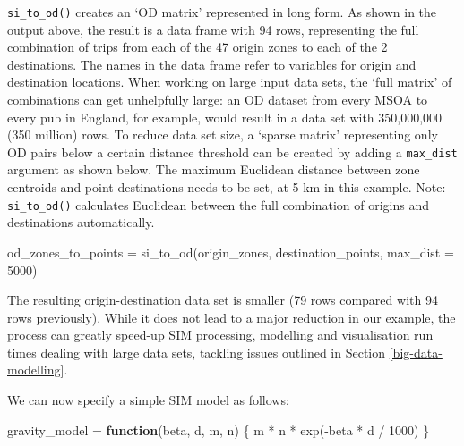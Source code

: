 \documentclass[11pt,letterpaper]{article}
\newenvironment{Shaded}{\begin{snugshade}}{\end{snugshade}}
\newcommand{\AttributeTok}[1]{\textcolor[rgb]{0.77,0.63,0.00}{#1}}
\newcommand{\ControlFlowTok}[1]{\textcolor[rgb]{0.13,0.29,0.53}{\textbf{#1}}}
\newcommand{\DecValTok}[1]{\textcolor[rgb]{0.00,0.00,0.81}{#1}}
\newcommand{\FunctionTok}[1]{\textcolor[rgb]{0.00,0.00,0.00}{#1}}
\newcommand{\NormalTok}[1]{#1}
\newcommand{\OtherTok}[1]{\textcolor[rgb]{0.56,0.35,0.01}{#1}}
\newcommand{\SpecialCharTok}[1]{\textcolor[rgb]{0.00,0.00,0.00}{#1}}
\begin{document}
\texttt{si\_to\_od()} creates an `OD matrix' represented in long form.
As shown in the output above, the result is a data frame with 94 rows, representing the full combination of trips from each of the 47 origin zones to each of the 2 destinations.
The names in the data frame refer to variables for origin and destination locations.
When working on large input data sets, the `full matrix' of combinations can get unhelpfully large: an OD dataset from every MSOA to every pub in England, for example, would result in a data set with 350,000,000 (350 million) rows.
To reduce data set size, a `sparse matrix' representing only OD pairs below a certain distance threshold can be created by adding a \texttt{max\_dist} argument as shown below.
The maximum Euclidean distance between zone centroids and point destinations needs to be set, at 5 km in this example.
Note: \texttt{si\_to\_od()} calculates Euclidean between the full combination of origins and destinations automatically.

\begin{Shaded}
\begin{Highlighting}[]
\NormalTok{od\_zones\_to\_points }\OtherTok{=} \FunctionTok{si\_to\_od}\NormalTok{(origin\_zones, }
\NormalTok{                              destination\_points, }
                              \AttributeTok{max\_dist =} \DecValTok{5000}\NormalTok{)}
\end{Highlighting}
\end{Shaded}

The resulting origin-destination data set is smaller (79 rows compared with 94 rows previously).
While it does not lead to a major reduction in our example, the process can greatly speed-up SIM processing, modelling and visualisation run times dealing with large data sets, tackling issues outlined in Section \ref{big-data-modelling}.

We can now specify a simple SIM model as follows:

\begin{Shaded}
\begin{Highlighting}[]
\NormalTok{gravity\_model }\OtherTok{=} \ControlFlowTok{function}\NormalTok{(beta, d, m, n) \{}
\NormalTok{  m }\SpecialCharTok{*}\NormalTok{ n }\SpecialCharTok{*} \FunctionTok{exp}\NormalTok{(}\SpecialCharTok{{-}}\NormalTok{beta }\SpecialCharTok{*}\NormalTok{ d }\SpecialCharTok{/} \DecValTok{1000}\NormalTok{)}
\NormalTok{\} }
\end{Highlighting}
\end{Shaded}
\end{document}
